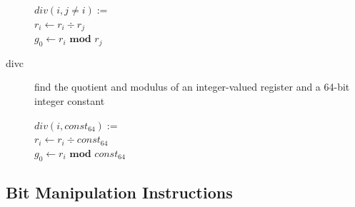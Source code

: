 \documentclass[english,a4paper]{article}
\begin{document}
\begin{description}
	$div(i, j\neq i) :=$ \\
	$ r _{i} \longleftarrow  r _{i} \div r _{j}$ \\
	$ g _{0} \longleftarrow  r _{i} \textbf{ mod } r _{j} $\\
	
	\item[divc] find the quotient and modulus of an integer-valued
	register and a 64-bit integer constant
	
	$div(i, const _{64}) :=$ \\
	$ r _{i} \longleftarrow  r _{i} \div const_{64}$ \\
	$ g _{0} \longleftarrow r _{i} \textbf{ mod } const_{64} $
	
\end{description}

\subsection{Bit Manipulation Instructions}
\end{document}
